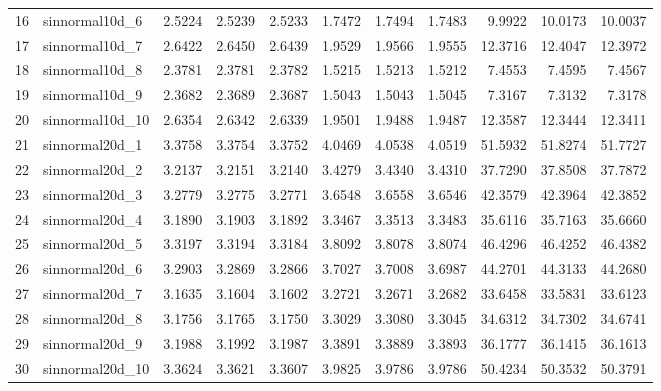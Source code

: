 \begin{table}[ht]
\begin{tabular}{rlrrrrrrrrr}
  16 & sinnormal10d\_6 & 2.5224 & 2.5239 & 2.5233 & 1.7472 & 1.7494 & 1.7483 & 9.9922 & 10.0173 & 10.0037 \\ 
  17 & sinnormal10d\_7 & 2.6422 & 2.6450 & 2.6439 & 1.9529 & 1.9566 & 1.9555 & 12.3716 & 12.4047 & 12.3972 \\ 
  18 & sinnormal10d\_8 & 2.3781 & 2.3781 & 2.3782 & 1.5215 & 1.5213 & 1.5212 & 7.4553 & 7.4595 & 7.4567 \\ 
  19 & sinnormal10d\_9 & 2.3682 & 2.3689 & 2.3687 & 1.5043 & 1.5043 & 1.5045 & 7.3167 & 7.3132 & 7.3178 \\ 
  20 & sinnormal10d\_10 & 2.6354 & 2.6342 & 2.6339 & 1.9501 & 1.9488 & 1.9487 & 12.3587 & 12.3444 & 12.3411 \\ 
  21 & sinnormal20d\_1 & 3.3758 & 3.3754 & 3.3752 & 4.0469 & 4.0538 & 4.0519 & 51.5932 & 51.8274 & 51.7727 \\ 
  22 & sinnormal20d\_2 & 3.2137 & 3.2151 & 3.2140 & 3.4279 & 3.4340 & 3.4310 & 37.7290 & 37.8508 & 37.7872 \\ 
  23 & sinnormal20d\_3 & 3.2779 & 3.2775 & 3.2771 & 3.6548 & 3.6558 & 3.6546 & 42.3579 & 42.3964 & 42.3852 \\ 
  24 & sinnormal20d\_4 & 3.1890 & 3.1903 & 3.1892 & 3.3467 & 3.3513 & 3.3483 & 35.6116 & 35.7163 & 35.6660 \\ 
  25 & sinnormal20d\_5 & 3.3197 & 3.3194 & 3.3184 & 3.8092 & 3.8078 & 3.8074 & 46.4296 & 46.4252 & 46.4382 \\ 
  26 & sinnormal20d\_6 & 3.2903 & 3.2869 & 3.2866 & 3.7027 & 3.7008 & 3.6987 & 44.2701 & 44.3133 & 44.2680 \\ 
  27 & sinnormal20d\_7 & 3.1635 & 3.1604 & 3.1602 & 3.2721 & 3.2671 & 3.2682 & 33.6458 & 33.5831 & 33.6123 \\ 
  28 & sinnormal20d\_8 & 3.1756 & 3.1765 & 3.1750 & 3.3029 & 3.3080 & 3.3045 & 34.6312 & 34.7302 & 34.6741 \\ 
  29 & sinnormal20d\_9 & 3.1988 & 3.1992 & 3.1987 & 3.3891 & 3.3889 & 3.3893 & 36.1777 & 36.1415 & 36.1613 \\ 
  30 & sinnormal20d\_10 & 3.3624 & 3.3621 & 3.3607 & 3.9825 & 3.9786 & 3.9786 & 50.4234 & 50.3532 & 50.3791 \\ 
   \hline
\end{tabular}
\end{table}
